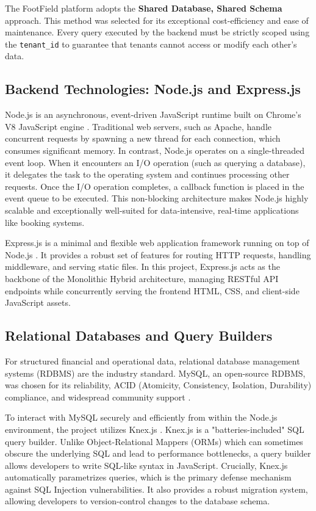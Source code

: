 The FootField platform adopts the \textbf{Shared Database, Shared Schema} approach. This method was selected for its exceptional cost-efficiency and ease of maintenance. Every query executed by the backend must be strictly scoped using the \texttt{tenant\_id} to guarantee that tenants cannot access or modify each other's data.

\subsection{Backend Technologies: Node.js and Express.js}
Node.js is an asynchronous, event-driven JavaScript runtime built on Chrome's V8 JavaScript engine \cite{nodejs}. Traditional web servers, such as Apache, handle concurrent requests by spawning a new thread for each connection, which consumes significant memory. In contrast, Node.js operates on a single-threaded event loop. When it encounters an I/O operation (such as querying a database), it delegates the task to the operating system and continues processing other requests. Once the I/O operation completes, a callback function is placed in the event queue to be executed. This non-blocking architecture makes Node.js highly scalable and exceptionally well-suited for data-intensive, real-time applications like booking systems.

Express.js is a minimal and flexible web application framework running on top of Node.js \cite{expressjs}. It provides a robust set of features for routing HTTP requests, handling middleware, and serving static files. In this project, Express.js acts as the backbone of the Monolithic Hybrid architecture, managing RESTful API endpoints while concurrently serving the frontend HTML, CSS, and client-side JavaScript assets.

\subsection{Relational Databases and Query Builders}
For structured financial and operational data, relational database management systems (RDBMS) are the industry standard. MySQL, an open-source RDBMS, was chosen for its reliability, ACID (Atomicity, Consistency, Isolation, Durability) compliance, and widespread community support \cite{mysql}.

To interact with MySQL securely and efficiently from within the Node.js environment, the project utilizes Knex.js \cite{knexjs}. Knex.js is a "batteries-included" SQL query builder. Unlike Object-Relational Mappers (ORMs) which can sometimes obscure the underlying SQL and lead to performance bottlenecks, a query builder allows developers to write SQL-like syntax in JavaScript. Crucially, Knex.js automatically parametrizes queries, which is the primary defense mechanism against SQL Injection vulnerabilities. It also provides a robust migration system, allowing developers to version-control changes to the database schema.

